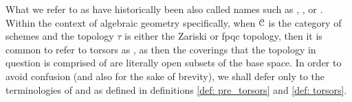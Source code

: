             \begin{convention}
                What we refer to as  have historically been also called names such as , , or . Within the context of algebraic geometry specifically, when $\mathcal{C}$ is the category of schemes and the topology $\tau$ is either the Zariski or fpqc topology, then it is common to refer to torsors as , as then the coverings that the topology in question is comprised of are literally open subsets of the base space. In order to avoid confusion (and also for the sake of brevity), we shall defer only to the terminologies of  and  as defined in definitions \ref{def: pre_torsors} and \ref{def: torsors}.
            \end{convention}
            
